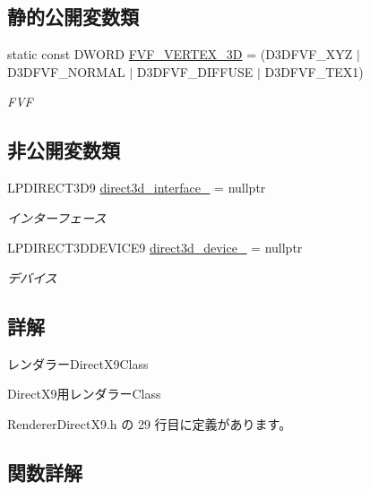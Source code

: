 \subsection*{静的公開変数類}
\begin{DoxyCompactItemize}
\item 
static const D\+W\+O\+RD \mbox{\hyperlink{class_renderer_direct_x9_a80ce0089b01354986332553353625da6}{F\+V\+F\+\_\+\+V\+E\+R\+T\+E\+X\+\_\+3D}} = (D3\+D\+F\+V\+F\+\_\+\+X\+YZ $\vert$ D3\+D\+F\+V\+F\+\_\+\+N\+O\+R\+M\+AL $\vert$ D3\+D\+F\+V\+F\+\_\+\+D\+I\+F\+F\+U\+SE $\vert$ D3\+D\+F\+V\+F\+\_\+\+T\+E\+X1)
\begin{DoxyCompactList}\small\item\em F\+VF \end{DoxyCompactList}\end{DoxyCompactItemize}
\subsection*{非公開変数類}
\begin{DoxyCompactItemize}
\item 
L\+P\+D\+I\+R\+E\+C\+T3\+D9 \mbox{\hyperlink{class_renderer_direct_x9_a1616ee343f701fe647ed8d1727c8229d}{direct3d\+\_\+interface\+\_\+}} = nullptr
\begin{DoxyCompactList}\small\item\em インターフェース \end{DoxyCompactList}\item 
L\+P\+D\+I\+R\+E\+C\+T3\+D\+D\+E\+V\+I\+C\+E9 \mbox{\hyperlink{class_renderer_direct_x9_aba9ae366d583e965418423ec76454a61}{direct3d\+\_\+device\+\_\+}} = nullptr
\begin{DoxyCompactList}\small\item\em デバイス \end{DoxyCompactList}\end{DoxyCompactItemize}


\subsection{詳解}
レンダラー\+Direct\+X9\+Class 

Direct\+X9用レンダラー\+Class 

 Renderer\+Direct\+X9.\+h の 29 行目に定義があります。



\subsection{関数詳解}
\mbox{\label{class_renderer_direct_x9_a5113bf4e6aefdb7bcab2016fbbee0174}} 

